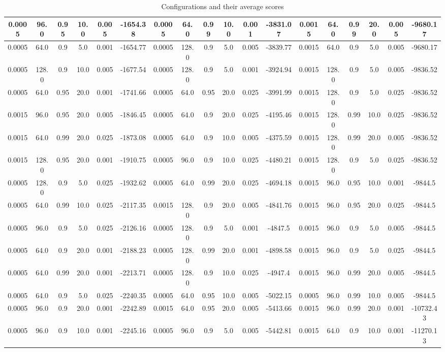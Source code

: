 \begin{table}[h]
\begin{tabular}{|c|c|c|c|c|c||c|c|c|c|c|c||c|c|c|c|c|c|}
    \hline
    0.0005 & 96.0 & 0.95 & 10.0 & 0.005 & -1654.38 & 0.0005 & 64.0 & 0.99 & 10.0 & 0.001 & -3831.07 & 0.0015 & 64.0 & 0.99 & 20.0 & 0.005 & -9680.17 \\
    \hline
    0.0005 & 64.0 & 0.9 & 5.0 & 0.001 & -1654.77 & 0.0005 & 128.0 & 0.9 & 5.0 & 0.005 & -3839.77 & 0.0015 & 64.0 & 0.9 & 5.0 & 0.005 & -9680.17 \\
    \hline
    0.0005 & 128.0 & 0.9 & 10.0 & 0.005 & -1677.54 & 0.0005 & 128.0 & 0.9 & 5.0 & 0.001 & -3924.94 & 0.0015 & 128.0 & 0.9 & 5.0 & 0.005 & -9836.52 \\
    \hline
    0.0005 & 64.0 & 0.95 & 20.0 & 0.001 & -1741.66 & 0.0005 & 64.0 & 0.95 & 20.0 & 0.025 & -3991.99 & 0.0015 & 128.0 & 0.9 & 5.0 & 0.025 & -9836.52 \\
    \hline
    0.0015 & 96.0 & 0.95 & 20.0 & 0.005 & -1846.45 & 0.0005 & 64.0 & 0.9 & 20.0 & 0.025 & -4195.46 & 0.0015 & 128.0 & 0.99 & 10.0 & 0.025 & -9836.52 \\
    \hline
    0.0015 & 64.0 & 0.99 & 20.0 & 0.025 & -1873.08 & 0.0005 & 64.0 & 0.9 & 10.0 & 0.005 & -4375.59 & 0.0015 & 128.0 & 0.99 & 20.0 & 0.005 & -9836.52 \\
    \hline
    0.0015 & 128.0 & 0.95 & 20.0 & 0.001 & -1910.75 & 0.0005 & 96.0 & 0.9 & 10.0 & 0.025 & -4480.21 & 0.0015 & 128.0 & 0.9 & 5.0 & 0.025 & -9836.52 \\
    \hline
    0.0005 & 128.0 & 0.9 & 5.0 & 0.025 & -1932.62 & 0.0005 & 64.0 & 0.99 & 20.0 & 0.025 & -4694.18 & 0.0015 & 96.0 & 0.95 & 10.0 & 0.001 & -9844.5 \\
    \hline
    0.0005 & 64.0 & 0.99 & 10.0 & 0.025 & -2117.35 & 0.0015 & 128.0 & 0.9 & 20.0 & 0.005 & -4841.76 & 0.0015 & 96.0 & 0.95 & 20.0 & 0.025 & -9844.5 \\
    \hline
    0.0005 & 96.0 & 0.9 & 5.0 & 0.025 & -2126.16 & 0.0005 & 128.0 & 0.9 & 5.0 & 0.001 & -4847.5 & 0.0015 & 96.0 & 0.9 & 5.0 & 0.005 & -9844.5 \\
    \hline
    0.0005 & 64.0 & 0.9 & 20.0 & 0.001 & -2188.23 & 0.0005 & 128.0 & 0.99 & 20.0 & 0.001 & -4898.58 & 0.0015 & 96.0 & 0.9 & 5.0 & 0.025 & -9844.5 \\
    \hline
    0.0005 & 64.0 & 0.99 & 20.0 & 0.001 & -2213.71 & 0.0005 & 128.0 & 0.9 & 10.0 & 0.025 & -4947.4 & 0.0015 & 96.0 & 0.99 & 20.0 & 0.005 & -9844.5 \\
    \hline
    0.0005 & 64.0 & 0.9 & 5.0 & 0.025 & -2240.35 & 0.0005 & 64.0 & 0.95 & 10.0 & 0.005 & -5022.15 & 0.0005 & 96.0 & 0.99 & 10.0 & 0.005 & -9844.5 \\
    \hline
    0.0005 & 96.0 & 0.9 & 20.0 & 0.001 & -2242.89 & 0.0015 & 64.0 & 0.95 & 20.0 & 0.005 & -5413.66 & 0.0015 & 96.0 & 0.99 & 20.0 & 0.001 & -10732.43 \\
    \hline
    0.0005 & 96.0 & 0.9 & 10.0 & 0.001 & -2245.16 & 0.0005 & 96.0 & 0.9 & 5.0 & 0.005 & -5442.81 & 0.0015 & 64.0 & 0.9 & 10.0 & 0.001 & -11270.13 \\
    \hline
    \end{tabular}
    \caption{Configurations and their average scores}
    \label{tab:config_scores}
    \end{table}
    